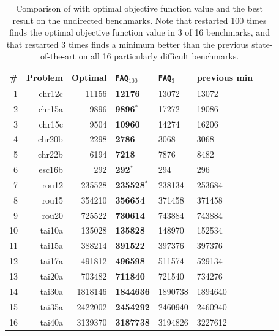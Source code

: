 \documentclass[11pt]{article}
\begin{document}
\begin{table}[h!]
\caption{Comparison of \FAQ with optimal objective function value and the best result  on the undirected benchmarks.  Note that \FAQ restarted 100 times finds the optimal objective function value in 3 of 16 benchmarks, and that \FAQ restarted 3 times finds a minimum better than the previous state-of-the-art on all 16 particularly difficult benchmarks.}
\begin{center}
\begin{tabular}{|r|r|r||l|l|l|l|l|}
\hline
\# & Problem  &   Optimal    & \texttt{FAQ}$_{100}$ & \texttt{FAQ}$_{3}$ & previous min \\
\hline
1&    chr12c &   11156 &    \textbf{12176} &   13072 & 13072 \\
2&    chr15a &    9896 &    \textbf{9896}$^*$ &   17272 &  19086 \\
3&    chr15c &    9504 &    \textbf{10960} &   14274 &  16206 \\
4&   chr20b &    2298 &     \textbf{2786} &    3068 &    3068 \\
5&    chr22b &    6194 &    \textbf{7218} &    7876 &   8482 \\
6&    esc16b & 	292 & 		\textbf{292}$^*$ & 294 &    296 \\
7& 	   rou12 &  235528 &  \textbf{235528}$^*$ &  238134 &    253684 \\
8& 	   rou15 &  354210 &  \textbf{356654} &  371458 &    371458 \\
9&      rou20 &  725522 &  \textbf{730614} &  743884 &    743884 \\
10&    tai10a &  135028 &  \textbf{135828} &  148970 &    152534 \\
11&    tai15a &  388214 &  \textbf{391522} &  397376 &    397376 \\
12&    tai17a &  491812 &  \textbf{496598} &  511574 &    529134 \\
13&    tai20a &  703482 &  \textbf{711840} &  721540 &    734276 \\
14&    tai30a & 1818146 & \textbf{1844636} & 1890738 &  1894640 \\
15&    tai35a & 2422002 & \textbf{2454292} & 2460940 &  2460940 \\
16&    tai40a & 3139370 & \textbf{3187738} & 3194826 &  3227612 \\
    \hline
\end{tabular}
\end{center}
\label{tab:restarts}
\end{table}%
\end{document}
